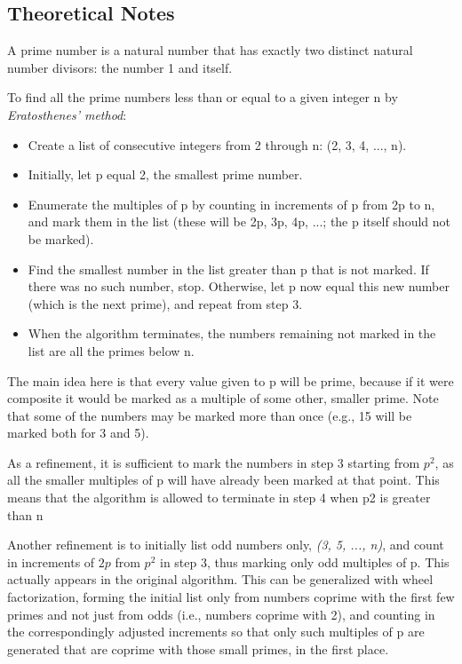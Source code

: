 \documentclass[a4paper, 12pt]{article}
\begin{document}
\subsection{Theoretical Notes}

A prime number is a natural number that has exactly two distinct natural number divisors: the number 1 and itself.

To find all the prime numbers less than or equal to a given integer n by \textit{Eratosthenes' method}:

\begin{itemize}
  \item Create a list of consecutive integers from 2 through n: (2, 3, 4, ..., n).
  \item Initially, let p equal 2, the smallest prime number.
  \item Enumerate the multiples of p by counting in increments of p from 2p to n, and mark them in the list (these will be 2p, 3p, 4p, ...; the p itself should not be marked).
  \item Find the smallest number in the list greater than p that is not marked. If there was no such number, stop. Otherwise, let p now equal this new number (which is the next prime), and repeat from step 3.
  \item When the algorithm terminates, the numbers remaining not marked in the list are all the primes below n.
\end{itemize}

The main idea here is that every value given to p will be prime, because if it were composite it would be marked as a multiple of some other, smaller prime. Note that some of the numbers may be marked more than once (e.g., 15 will be marked both for 3 and 5).

As a refinement, it is sufficient to mark the numbers in step 3 starting from $p^2$, as all the smaller multiples of p will have already been marked at that point. This means that the algorithm is allowed to terminate in step 4 when p2 is greater than n

Another refinement is to initially list odd numbers only, \textit{(3, 5, ..., n)}, and count in increments of $2p$ from $p^2$ in step 3, thus marking only odd multiples of p. This actually appears in the original algorithm. This can be generalized with wheel factorization, forming the initial list only from numbers coprime with the first few primes and not just from odds (i.e., numbers coprime with 2), and counting in the correspondingly adjusted increments so that only such multiples of p are generated that are coprime with those small primes, in the first place.
\end{document}

